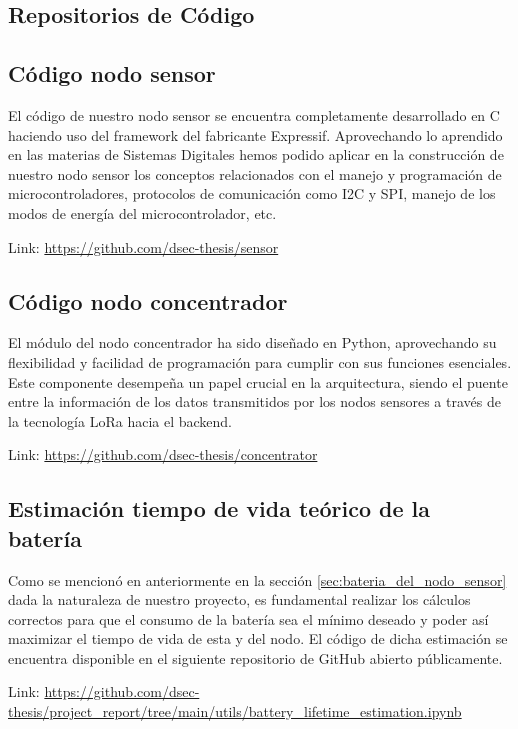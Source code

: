 \clearpage

\begin{appendixd}
    \section{Repositorios de Código}
    \subsection{Código nodo sensor}{\label{codigo_sensor}}
    El código de nuestro nodo sensor se encuentra completamente desarrollado en C
    haciendo uso del framework del fabricante Expressif. Aprovechando lo aprendido en las
    materias de Sistemas Digitales hemos podido aplicar en la construcción de nuestro
    nodo sensor los conceptos relacionados con el manejo y programación de
    microcontroladores, protocolos de comunicación como I2C y SPI, manejo de los
    modos de energía del microcontrolador, etc.

    Link: \url{https://github.com/dsec-thesis/sensor}

    \subsection{Código nodo concentrador}{\label{codigo_concentrador}}
    El módulo del nodo concentrador ha sido diseñado en Python, aprovechando su
    flexibilidad y facilidad de programación para cumplir con sus funciones esenciales.
    Este componente desempeña un papel crucial en la arquitectura, siendo el puente entre
    la información de los datos transmitidos por los nodos sensores a través de la
    tecnología LoRa hacia el backend.

    Link: \url{https://github.com/dsec-thesis/concentrator}

    \subsection{Estimación tiempo de vida teórico de la batería}{\label{codigo_estimacion_bateria}}
    Como se mencionó en anteriormente en la sección \ref{sec:bateria_del_nodo_sensor}
    dada la naturaleza de nuestro proyecto, es fundamental realizar los cálculos
    correctos para que el consumo de la batería sea el mínimo deseado y poder así
    maximizar el tiempo de vida de esta y del nodo. El código de dicha estimación se
    encuentra disponible en el siguiente repositorio de GitHub abierto públicamente.

    Link: \url{https://github.com/dsec-thesis/project_report/tree/main/utils/battery_lifetime_estimation.ipynb}


\end{appendixd}
